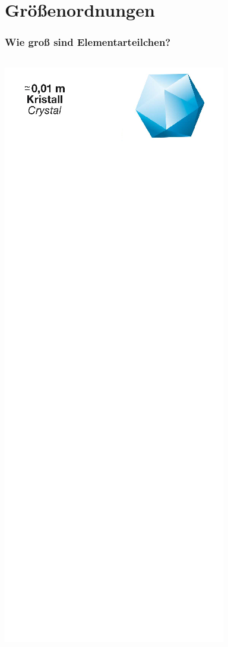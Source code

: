 \documentclass{beamer}
\begin{document}
\section{Gr\"o\ss{}enordnungen}
\begin{frame}
  \frametitle{Wie gro\ss{} sind Elementarteilchen?}
  \vskip-0.2cm
  \begin{columns}[T]
    \begin{column}{0.25\textwidth}
      \centering
      \includegraphics[width=\textwidth]{matter/VKZQ_Kristall.png}

\end{column}
\end{columns}
\end{frame}
\end{document}
